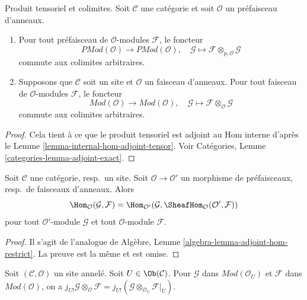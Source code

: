 \begin{lemma}
\label{lemma-tensor-commute-colimits}
Produit tensoriel et colimites.
Soit $\mathcal{C}$ une catégorie et soit $\mathcal{O}$ un préfaisceau
d'anneaux.
\begin{enumerate}
\item Pour tout préfaisceau de $\mathcal{O}$-modules $\mathcal{F}$, le foncteur
$$
\textit{PMod}(\mathcal{O}) \longrightarrow \textit{PMod}(\mathcal{O})
, \quad
\mathcal{G} \longmapsto \mathcal{F} \otimes_{p, \mathcal{O}} \mathcal{G}
$$
commute aux colimites arbitraires.
\item
Supposons que $\mathcal{C}$ soit un site et $\mathcal{O}$ un faisceau
d'anneaux. Pour tout faisceau de $\mathcal{O}$-modules $\mathcal{F}$, le
foncteur
$$
\textit{Mod}(\mathcal{O}) \longrightarrow \textit{Mod}(\mathcal{O})
, \quad
\mathcal{G} \longmapsto \mathcal{F} \otimes_\mathcal{O} \mathcal{G}
$$
commute aux colimites arbitraires.
\end{enumerate}
\end{lemma}

\begin{proof}
Cela tient à ce que le produit tensoriel est adjoint au Hom interne d'après
le Lemme \ref{lemma-internal-hom-adjoint-tensor}.
Voir Catégories, Lemme \ref{categories-lemma-adjoint-exact}.
\end{proof}

\begin{lemma}
\label{lemma-adjoint-hom-restrict}
Soit $\mathcal{C}$ une catégorie, resp.\ un site.
Soit $\mathcal{O} \to \mathcal{O}'$ un morphisme de préfaisceaux, resp.\ de
faisceaux d'anneaux. Alors
$$
\Hom_\mathcal{O}(\mathcal{G}, \mathcal{F}) =
\Hom_{\mathcal{O}'}(\mathcal{G},
\SheafHom_\mathcal{O}(\mathcal{O}', \mathcal{F}))
$$
pour tout $\mathcal{O}'$-module $\mathcal{G}$ et tout $\mathcal{O}$-module
$\mathcal{F}$.
\end{lemma}

\begin{proof}
Il s'agit de l'analogue de
Algèbre, Lemme \ref{algebra-lemma-adjoint-hom-restrict}.
La preuve est la même et est omise.
\end{proof}

\begin{lemma}
\label{lemma-j-shriek-and-tensor}
Soit $(\mathcal{C}, \mathcal{O})$ un site annelé.
Soit $U \in \Ob(\mathcal{C})$.
Pour $\mathcal{G}$ dans $\textit{Mod}(\mathcal{O}_U)$ et $\mathcal{F}$ dans
$\textit{Mod}(\mathcal{O})$, on a
$j_{U!}\mathcal{G} \otimes_\mathcal{O} \mathcal{F} =
j_{U!}(\mathcal{G} \otimes_{\mathcal{O}_U} \mathcal{F}|_U)$.
\end{lemma}


